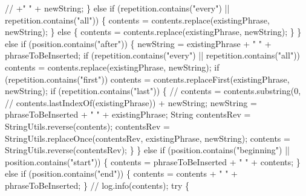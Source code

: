\begin{DoxyCode}
                        \textcolor{comment}{// +" " + newString;}
                    \} \textcolor{keywordflow}{else} \textcolor{keywordflow}{if} (repetition.contains(\textcolor{stringliteral}{"every"})
                            || repetition.contains(\textcolor{stringliteral}{"all"})) \{
                        contents = contents.replace(existingPhrase, newString);
                    \} \textcolor{keywordflow}{else} \{
                        contents = contents.replace(existingPhrase, newString);
                    \}
                \} \textcolor{keywordflow}{else} \textcolor{keywordflow}{if} (position.contains(\textcolor{stringliteral}{"after"})) \{
                    newString = existingPhrase + \textcolor{stringliteral}{" "} + phraseToBeInserted;
                    \textcolor{keywordflow}{if} (repetition.contains(\textcolor{stringliteral}{"every"})
                            || repetition.contains(\textcolor{stringliteral}{"all"}))
                        contents = contents.replace(existingPhrase, newString);
                    \textcolor{keywordflow}{if} (repetition.contains(\textcolor{stringliteral}{"first"}))
                        contents = contents.replaceFirst(existingPhrase,
                                newString);
                    \textcolor{keywordflow}{if} (repetition.contains(\textcolor{stringliteral}{"last"})) \{
                        \textcolor{comment}{// contents = contents.substring(0,}
                        \textcolor{comment}{// contents.lastIndexOf(existingPhrase)) + newString;}
                        newString = phraseToBeInserted + \textcolor{stringliteral}{" "} + existingPhrase;
                        String contentsRev = StringUtils.reverse(contents);
                        contentsRev = StringUtils.replaceOnce(contentsRev,
                                existingPhrase, newString);
                        contents = StringUtils.reverse(contentsRev);
                    \}
                \} \textcolor{keywordflow}{else} \textcolor{keywordflow}{if} (position.contains(\textcolor{stringliteral}{"beginning"})
                        || position.contains(\textcolor{stringliteral}{"start"})) \{
                    contents = phraseToBeInserted + \textcolor{stringliteral}{" "} + contents;
                \} \textcolor{keywordflow}{else} \textcolor{keywordflow}{if} (position.contains(\textcolor{stringliteral}{"end"})) \{
                    contents = contents + \textcolor{stringliteral}{" "} + phraseToBeInserted;
                \}
                \textcolor{comment}{// log.info(contents);}
                \textcolor{keywordflow}{try} \{

\end{DoxyCode}
